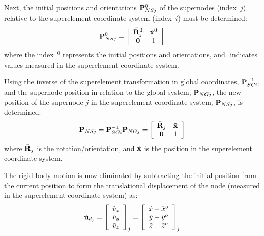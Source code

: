 {Next, the initial positions and orientations ${\bf P}_{NSj}^0$ of the supernodes
(index~$j$) relative to the superelement coordinate system (index~$i$) must be
determined:
%
\begin{equation}
{\bf P}_{NSj}^0 =
\left[\begin{array}{cc}
\tilde{\bf R}_j^0 & \tilde{\bf x}^0 \\
{\bf 0} & 1
\end{array}\right]
\end{equation}
%
where the index~$^0$ represents the initial positions and orientations,
and $\tilde{}$ indicates values measured in the superelement coordinate system.

Using the inverse of the superelement transformation in {\underline g}lobal
coordinates, ${\bf P}_{SGi}^{-1}$, and the supernode position in relation to the
global system, ${\bf P}_{NGj}$, the new position of the supernode $j$ in the
superelement coordinate system, ${\bf P}_{NSj}$, is determined:
%
\begin{equation}
{\bf P}_{NSj} =  {\bf P}_{SGi}^{-1}
{\bf P}_{NGj} = \left[\begin{array}{cc}
\tilde{\bf R}_j & \tilde{\bf x} \\
\bf 0 & 1 \end{array}\right]
\label{eqSC:Png}
\end{equation}
%
where $\tilde{\bf R}_j$ is the rotation/orientation, and $\tilde{\bf x}$ is the
position in the superelement coordinate system.

The rigid body motion is now eliminated by subtracting the initial position from
the current position to form the translational displacement of the node
(measured in the superelement coordinate system) as:
%
\begin{equation}
\tilde{\bf u}_{d_j} = \left[\begin{array}{c}
\tilde{v}_x \\
\tilde{v}_y \\
\tilde{v}_z
\end{array}\right]_j = \left[\begin{array}{c}
\tilde{x} - \tilde{x}^o \\
\tilde{y} - \tilde{y}^o \\
\tilde{z} - \tilde{z}^o
\end{array}\right]_j
\label{eq:defTranslation}
\end{equation}

}
